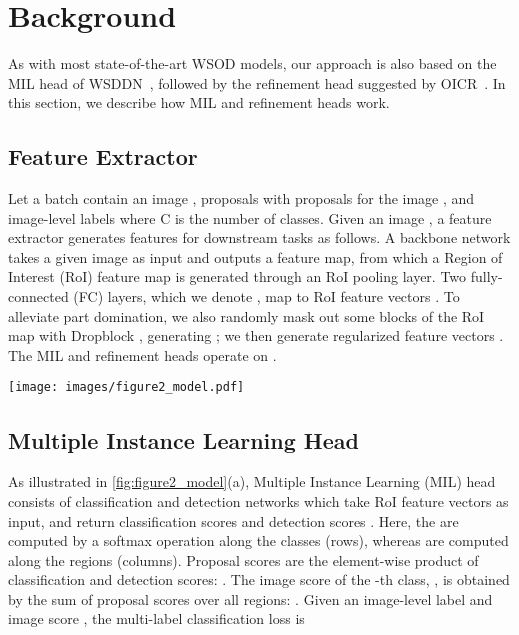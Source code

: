 \documentclass[runningheads]{llncs}
\begin{document}
\section{Background}

\label{sec:preliminary}
As with most state-of-the-art WSOD models, our approach is also based on the MIL head of WSDDN~\cite{Bilen_2016_CVPR}, followed by the refinement head suggested by OICR~\cite{Tang_2017_CVPR}.
In this section, we describe how MIL and refinement heads work.

\subsection{Feature Extractor}
Let a batch  contain an image , proposals  with  proposals for the image , and image-level labels  where C is the number of classes.
Given an image , a feature extractor generates features for downstream tasks as follows.
A backbone network takes a given image as input and outputs a feature map, from which a Region of Interest (RoI) feature map  is generated through an RoI pooling layer.
Two fully-connected (FC) layers, which we denote , map  to RoI feature vectors .
To alleviate part domination, we also randomly mask out some blocks of the RoI map with Dropblock \cite{ren2020instance}, generating ;
we then generate regularized feature vectors .
The MIL and refinement heads operate on .


\begin{figure*}[t!]
\centering
\texttt{[image: images/figure2\_model.pdf]}
\caption{Overall architecture of the proposed method. Initial prediction in (a) collects top-scoring instances over all stages. Sampling step for Object Discovery in (b) iterates step (a) for all images in a batch, and applies feature augmentations described in \cref{sec:sampling_strategy}.
Object discovery in (c) mines additional pseudo groundtruths that are not recognized by the argmax method.}
\label{fig:figure2_model}
\end{figure*}

\subsection{Multiple Instance Learning Head}
\label{sec:MIL}
As illustrated in \cref{fig:figure2_model}(a), Multiple Instance Learning (MIL) head consists of classification and detection networks which take RoI feature vectors  as input, and return classification scores  and detection scores . Here, the  are computed by a softmax operation along the classes (rows), whereas  are computed along the regions (columns).
Proposal scores  are the element-wise product of classification and detection scores: .
The image score of the -th class, , is obtained by the sum of proposal scores over all regions: .
Given an image-level label  and image score , the multi-label classification loss  is
  
\end{document}
